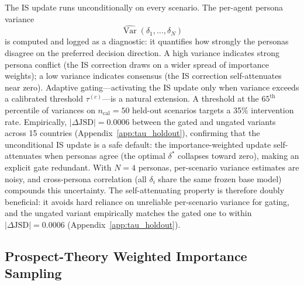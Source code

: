 \documentclass{article}
\begin{document}
The IS update runs unconditionally on every scenario.
The per-agent persona variance
\begin{equation}
  \widehat{\operatorname{Var}}(\delta_1, \ldots, \delta_N)
  \label{eq:tau}
\end{equation}
is computed and logged as a diagnostic: it quantifies how strongly the personas
disagree on the preferred decision direction. A high variance indicates strong
persona conflict (the IS correction draws on a wider spread of importance
weights); a low variance indicates consensus (the IS correction self-attenuates
near zero).
Adaptive gating---activating the IS update only when variance exceeds a calibrated
threshold $\tau^{(c)}$---is a natural extension. A threshold at the
$65^{\text{th}}$ percentile of variances on $n_{\text{cal}}=50$ held-out
scenarios targets a 35\% intervention rate. Empirically, $|\Delta\text{JSD}|=0.0006$
between the gated and ungated variants across 15 countries
(Appendix~\ref{app:tau_holdout}), confirming that the unconditional IS update is
a safe default: the importance-weighted update self-attenuates when personas agree
(the optimal $\delta^*$ collapses toward zero), making an explicit gate redundant.
With $N{=}4$ personas, per-scenario variance estimates are noisy, and
cross-persona correlation (all $\delta_i$ share the same frozen base model)
compounds this uncertainty. The self-attenuating property is therefore doubly
beneficial: it avoids hard reliance on unreliable per-scenario variance for
gating, and the ungated variant empirically matches the gated one to within
$|\Delta\text{JSD}|=0.0006$ (Appendix~\ref{app:tau_holdout}).

\subsection{Prospect-Theory Weighted Importance Sampling}
\label{sec:method:ptis}
\end{document}
